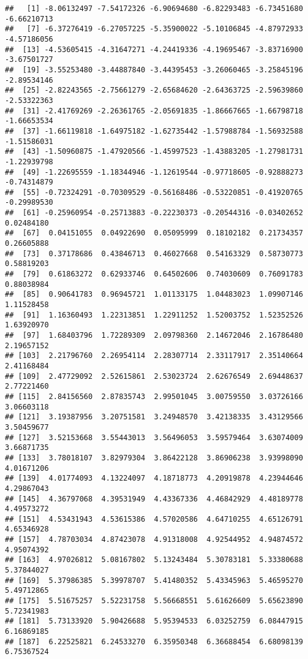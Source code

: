 \documentclass[
]{article}
\begin{document}
\begin{verbatim}
##   [1] -8.06132497 -7.54172326 -6.90694680 -6.82293483 -6.73451680 -6.66210713
##   [7] -6.37276419 -6.27057225 -5.35900022 -5.10106845 -4.87972933 -4.57186056
##  [13] -4.53605415 -4.31647271 -4.24419336 -4.19695467 -3.83716900 -3.67501727
##  [19] -3.55253480 -3.44887840 -3.44395453 -3.26060465 -3.25845196 -2.89534146
##  [25] -2.82243565 -2.75661279 -2.65684620 -2.64363725 -2.59639860 -2.53322363
##  [31] -2.41769269 -2.26361765 -2.05691835 -1.86667665 -1.66798718 -1.66653534
##  [37] -1.66119818 -1.64975182 -1.62735442 -1.57988784 -1.56932588 -1.51586031
##  [43] -1.50960875 -1.47920566 -1.45997523 -1.43883205 -1.27981731 -1.22939798
##  [49] -1.22695559 -1.18344946 -1.12619544 -0.97718605 -0.92888273 -0.74314879
##  [55] -0.72324291 -0.70309529 -0.56168486 -0.53220851 -0.41920765 -0.29989530
##  [61] -0.25960954 -0.25713883 -0.22230373 -0.20544316 -0.03402652  0.02484180
##  [67]  0.04151055  0.04922690  0.05095999  0.18102182  0.21734357  0.26605888
##  [73]  0.37178686  0.43846713  0.46027668  0.54163329  0.58730773  0.58819203
##  [79]  0.61863272  0.62933746  0.64502606  0.74030609  0.76091783  0.88038984
##  [85]  0.90641783  0.96945721  1.01133175  1.04483023  1.09907146  1.11528458
##  [91]  1.16360493  1.22313851  1.22911252  1.52003752  1.52352526  1.63920970
##  [97]  1.68403796  1.72289309  2.09798360  2.14672046  2.16786480  2.19657152
## [103]  2.21796760  2.26954114  2.28307714  2.33117917  2.35140664  2.41168484
## [109]  2.47729092  2.52615861  2.53023724  2.62676549  2.69448637  2.77221460
## [115]  2.84156560  2.87835743  2.99501045  3.00759550  3.03726166  3.06603118
## [121]  3.19387956  3.20751581  3.24948570  3.42138335  3.43129566  3.50459677
## [127]  3.52153668  3.55443013  3.56496053  3.59579464  3.63074009  3.66871735
## [133]  3.78018107  3.82979304  3.86422128  3.86906238  3.93998090  4.01671206
## [139]  4.01774093  4.13224097  4.18718773  4.20919878  4.23944646  4.29867043
## [145]  4.36797068  4.39531949  4.43367336  4.46842929  4.48189778  4.49573272
## [151]  4.53431943  4.53615386  4.57020586  4.64710255  4.65126791  4.65346928
## [157]  4.78703034  4.87423078  4.91318008  4.92544952  4.94874572  4.95074392
## [163]  4.97026812  5.08167802  5.13243484  5.30783181  5.33380688  5.37844027
## [169]  5.37986385  5.39978707  5.41480352  5.43345963  5.46595270  5.49712865
## [175]  5.51675257  5.52231758  5.56668551  5.61626609  5.65623890  5.72341983
## [181]  5.73133920  5.90426688  5.95394533  6.03252759  6.08447915  6.16869185
## [187]  6.22525821  6.24533270  6.35950348  6.36688454  6.68098139  6.75367524

\end{verbatim}
\end{document}
